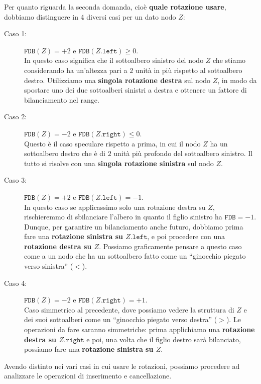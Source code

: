 \documentclass[12pt]{report}
\begin{document}
	Per quanto riguarda la seconda domanda, cioè \textbf{quale rotazione usare}, dobbiamo distinguere in 4 diversi casi per un dato nodo $Z$:
	\begin{description}
		\item[Caso 1:] $\texttt{FDB}(Z) = +2$ e $\texttt{FDB}(Z.\texttt{left}) \geq 0$. \\
		In questo caso significa che il sottoalbero sinistro del nodo $Z$ che stiamo considerando ha un'altezza pari a $2$ unità in più rispetto al sottoalbero destro. Utilizziamo una \textbf{singola rotazione destra} sul nodo $Z$, in modo da spostare uno dei due sottoalberi sinistri a destra e ottenere un fattore di bilanciamento nel range.
		
		\item[Caso 2:] $\texttt{FDB}(Z) = -2$ e $\texttt{FDB}(Z.\texttt{right}) \leq 0$. \\
		Questo è il caso speculare rispetto a prima, in cui il nodo $Z$ ha un sottoalbero destro che è di $2$ unità più profondo del sottoalbero sinistro. Il tutto si risolve con una \textbf{singola rotazione sinistra} sul nodo $Z$.
		
		\item[Caso 3:] $\texttt{FDB}(Z) = +2$ e $\texttt{FDB}(Z.\texttt{left}) = -1$. \\
		In questo caso se applicassimo solo una rotazione destra su $Z$, rischieremmo di sbilanciare l'albero in quanto il figlio sinistro ha $\texttt{FDB} = -1$. Dunque, per garantire un bilanciamento anche futuro, dobbiamo prima fare una \textbf{rotazione sinistra su $Z.\texttt{left}$}, e poi procedere con una \textbf{rotazione destra su $Z$}. Possiamo graficamente pensare a questo caso come a un nodo che ha un sottoalbero fatto come un ``ginocchio piegato verso sinistra'' ($<$).
		
		\item[Caso 4:] $\texttt{FDB}(Z) = -2$ e $\texttt{FDB}(Z.\texttt{right}) = +1$. \\
		Caso simmetrico al precedente, dove possiamo vedere la struttura di $Z$ e dei suoi sottoalberi come un ``ginocchio piegato verso destra'' ($>$). Le operazioni da fare saranno simmetriche: prima applichiamo una \textbf{rotazione destra su $Z.\texttt{right}$} e poi, una volta che il figlio destro sarà bilanciato, possiamo fare una \textbf{rotazione sinistra su $Z$}.
	\end{description}
	
	Avendo distinto nei vari casi in cui usare le rotazioni, possiamo procedere ad analizzare le operazioni di inserimento e cancellazione.
	
\end{document}
